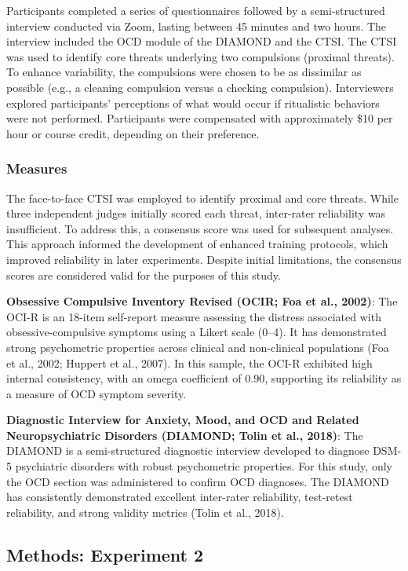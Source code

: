 \documentclass[
  man,floatsintext]{apa7}
\begin{document}
Participants completed a series of questionnaires followed by a semi-structured interview conducted via Zoom, lasting between 45 minutes and two hours.
The interview included the OCD module of the DIAMOND and the CTSI.
The CTSI was used to identify core threats underlying two compulsions (proximal threats).
To enhance variability, the compulsions were chosen to be as dissimilar as possible (e.g., a cleaning compulsion versus a checking compulsion).
Interviewers explored participants' perceptions of what would occur if ritualistic behaviors were not performed.
Participants were compensated with approximately \$10 per hour or course credit, depending on their preference.

\subsubsection{Measures}\label{measures-1}

The face-to-face CTSI was employed to identify proximal and core threats.
While three independent judges initially scored each threat, inter-rater reliability was insufficient.
To address this, a consensus score was used for subsequent analyses.
This approach informed the development of enhanced training protocols, which improved reliability in later experiments.
Despite initial limitations, the consensus scores are considered valid for the purposes of this study.

\textbf{Obsessive Compulsive Inventory Revised (OCIR; Foa et al., 2002)}:
The OCI-R is an 18-item self-report measure assessing the distress associated with obsessive-compulsive symptoms using a Likert scale (0--4).
It has demonstrated strong psychometric properties across clinical and non-clinical populations (Foa et al., 2002; Huppert et al., 2007).
In this sample, the OCI-R exhibited high internal consistency, with an omega coefficient of 0.90, supporting its reliability as a measure of OCD symptom severity.

\textbf{Diagnostic Interview for Anxiety, Mood, and OCD and Related Neuropsychiatric Disorders (DIAMOND; Tolin et al., 2018)}:
The DIAMOND is a semi-structured diagnostic interview developed to diagnose DSM-5 psychiatric disorders with robust psychometric properties.
For this study, only the OCD section was administered to confirm OCD diagnoses.
The DIAMOND has consistently demonstrated excellent inter-rater reliability, test-retest reliability, and strong validity metrics (Tolin et al., 2018).

\subsection{Methods: Experiment 2}\label{methods-experiment-2}
\end{document}
